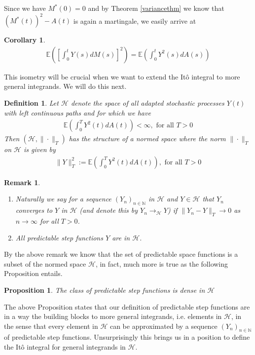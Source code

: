 \documentclass[11pt,a4paper, final]{article}
\newtheorem{prop}{Proposition}[section]
\newtheorem{cor}{Corollary}[thm]
\newtheorem{defn}{Definition}[section]
\newtheorem{rem}{Remark}[defn]
\begin{document}
\noindent Since we have $M^*(0)=0$ and by Theorem \ref{variancethm} we know that $(M^*(t))^2 -A(t)$ is again a martingale, we easily arrive at
\begin{cor} \label{corisometry} \begin{align*}
\mathbb{E} \left( \left[ \int_0^t Y(s) dM(s) \right]^2\right) = \mathbb{E} \left( \int_0^t Y^2(s) dA(s) \right) 
\end{align*}
\end{cor}
\noindent This isometry will be crucial when we want to extend the Itô integral to more general integrands. We will do this next.
\newpage
\begin{defn} Let $\mathcal{H}$ denote the space of all adapted stochastic processes $Y(t)$ with left continuous paths and for which we have
\begin{align*}
\mathbb{E} \left( \int_0^T Y^2(t) dA(t) \right) < \infty, \text{ for all } T >0
\end{align*}
Then $( \mathcal{H}, \| \cdot \|_T )$ has the structure of a normed space where the norm $\| \cdot \|_T$ on $\mathcal{H}$ is given by 
\begin{align*}
\| Y\|_T^2 := \mathbb{E} \left( \int_0^T Y^2(t) dA(t) \right), \text{ for all } T >0 
\end{align*}
\end{defn}
\begin{rem} \ \begin{enumerate}
\item Naturally we say for a sequence $(Y_n)_{n \in \mathbb{N}}$ in $\mathcal{H}$ and $Y \in \mathcal{H}$ that $Y_n$ converges to $Y$ in $\mathcal{H}$ (and denote this by $Y_n \to_\mathcal{H} Y$) if $\| Y_n - Y \|_T \to 0$ as $n \to \infty$ for all $T >0$. 
\item All predictable step functions $Y$ are in $\mathcal{H}$.
\end{enumerate}
\end{rem}
\noindent By the above remark we know that the set of predictable space functions is a subset of the normed space $\mathcal{H}$, in fact, much more is true as the following Proposition entails.
\begin{prop}
The class of predictable step functions is dense in $\mathcal{H}$ 
\end{prop}
\noindent The above Proposition states that our definition of predictable step functions are in a way the building blocks to more general integrands, i.e. elements in $\mathcal{H}$, in the sense that every element in $\mathcal{H}$ can be approximated by a sequence $(Y_n)_{n \in \mathbb{N}}$ of predictable step functions.  Unsurprisingly this brings us in a position to define the Itô integral for general integrands in $\mathcal{H}$. 
\end{document}
